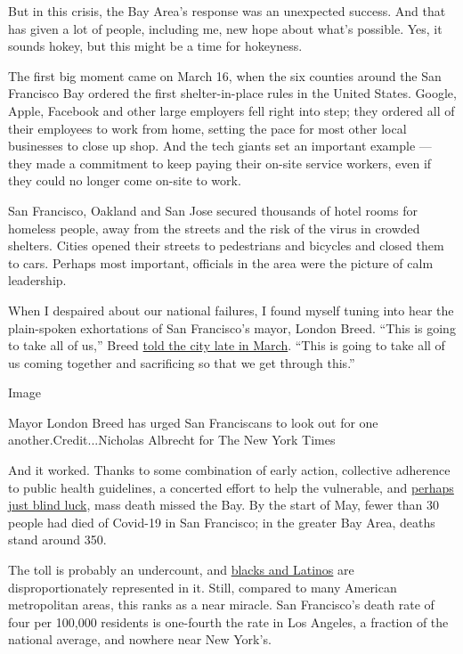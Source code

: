 But in this crisis, the Bay Area's response was an unexpected success.
And that has given a lot of people, including me, new hope about what's
possible. Yes, it sounds hokey, but this might be a time for hokeyness.

The first big moment came on March 16, when the six counties around the
San Francisco Bay ordered the first shelter-in-place rules in the United
States. Google, Apple, Facebook and other large employers fell right
into step; they ordered all of their employees to work from home,
setting the pace for most other local businesses to close up shop. And
the tech giants set an important example --- they made a commitment to
keep paying their on-site service workers, even if they could no longer
come on-site to work.

San Francisco, Oakland and San Jose secured thousands of hotel rooms for
homeless people, away from the streets and the risk of the virus in
crowded shelters. Cities opened their streets to pedestrians and
bicycles and closed them to cars. Perhaps most important, officials in
the area were the picture of calm leadership.

When I despaired about our national failures, I found myself tuning into
hear the plain-spoken exhortations of San Francisco's mayor, London
Breed. ``This is going to take all of us,'' Breed
\href{https://www.youtube.com/watch?v=YkkcLEJ-nLY}{told the city late in
March}. ``This is going to take all of us coming together and
sacrificing so that we get through this.''

Image

Mayor London Breed has urged San Franciscans to look out for one
another.Credit...Nicholas Albrecht for The New York Times

And it worked. Thanks to some combination of early action, collective
adherence to public health guidelines, a concerted effort to help the
vulnerable, and
\href{https://www.nbcbayarea.com/news/local/difference-between-covid-19-cases-in-ca-vs-ny-is-likely-sheer-luck-experts/2269934/}{perhaps
just blind luck}, mass death missed the Bay. By the start of May, fewer
than 30 people had died of Covid-19 in San Francisco; in the greater Bay
Area, deaths stand around 350.

The toll is probably an undercount, and
\href{https://www.nytimes.com/2020/04/28/us/coronavirus-california-black-latinos.html}{blacks
and Latinos} are disproportionately represented in it. Still, compared
to many American metropolitan areas, this ranks as a near miracle. San
Francisco's death rate of four per 100,000 residents is one-fourth the
rate in Los Angeles, a fraction of the national average, and nowhere
near New York's.

